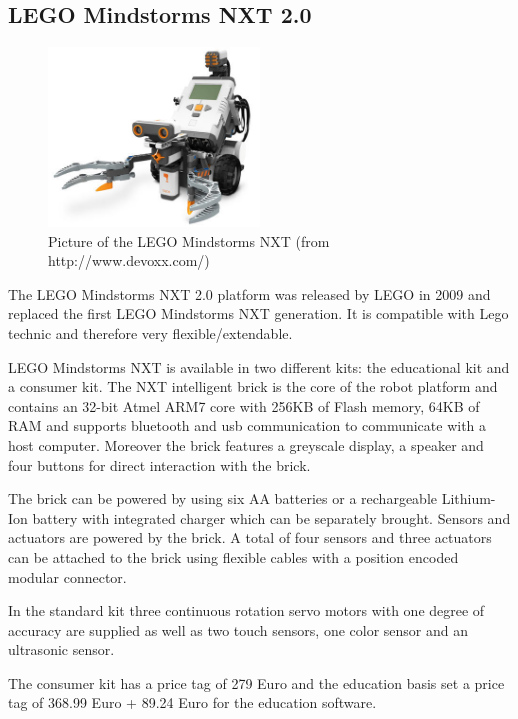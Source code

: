 \documentclass[11pt,a4paper]{article}
\begin{document}
\subsection{LEGO Mindstorms NXT 2.0}
\begin{figure}[h!]
  \centering
  \includegraphics[width=0.5\textwidth]{images/mindstorms.jpg}
  \caption{Picture of the LEGO Mindstorms NXT (from http://www.devoxx.com/)}
\end{figure}

The LEGO Mindstorms NXT 2.0 platform was released by LEGO in 2009 and replaced the first LEGO Mindstorms NXT generation. It is compatible with Lego technic and therefore very flexible/extendable.

LEGO Mindstorms NXT is available in two different kits: the educational kit and a consumer kit. The NXT intelligent brick is the core of the robot platform and contains an 32-bit Atmel ARM7 core with 256KB of Flash memory, 64KB of RAM and supports bluetooth and usb communication to communicate with a host computer. Moreover the brick features a greyscale display, a speaker and four buttons for direct interaction with the brick.

The brick can be powered by using six AA batteries or a rechargeable Lithium-Ion battery with integrated charger which can be separately brought. Sensors and actuators are powered by the brick. A total of four sensors and three actuators can be attached to the brick using flexible cables with a position encoded modular connector.

In the standard kit three continuous rotation servo motors with one degree of accuracy are supplied as well as two touch sensors, one color sensor and an ultrasonic sensor. 

The consumer kit has a price tag of 279 Euro and the education basis set a price tag of 368.99 Euro + 89.24 Euro for the education software.
\end{document}
